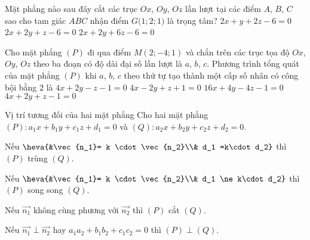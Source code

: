 \begin{ex}%
	Mặt phẳng nào sau đây cắt các trục $Ox$, $Oy$, $Oz$ lần lượt tại các điểm $A$, $B$, $C$ sao cho tam giác $ABC$ nhận điểm $G\big(1; 2; 1\big)$ là trọng tâm?
	{\True $2x + y + 2z  - 6 = 0$}
	{$2x + 2y + z  - 6 = 0$}
	{$2x + 2y + 6z - 6 = 0$} 
\end{ex}
\begin{ex}%
	Cho mặt phẳng  $\left(P\right)$ đi qua điểm $M\left(2; - 4; 1\right)$  và chắn trên các trục tọa độ $Ox$, $Oy$, $Oz$ theo ba đoạn có độ dài đại số lần lượt là $a$, $b$, $c$. Phương trình tổng quát của mặt phẳng $\left(P\right)$ khi $a$, $b$, $c$ theo thứ tự tạo thành một cấp số nhân có công bội bằng $2$ là 
	\choice
	{$4x + 2y - z - 1 = 0$}
	{$4x -  2y + z +  1 = 0$}
	{$16x + 4y - 4z - 1 = 0$}
	{\True $4x + 2y +  z - 1 = 0$}
\end{ex}

\begin{dang}{Vị trí tương đối của hai mặt phẳng}
	Cho hai mặt phẳng $(P) \colon a_1x+b_1y+c_1z+d_1=0$ và $(Q) \colon a_2x+b_2y+c_2z+d_2=0$.
		\begin{listEX}[1]
		\item [\ding{172}] Nếu $\heva{&\vec{n_1}= k \cdot \vec{n_2}\\& d_1 =k\cdot d_2}$ thì $(P)$ trùng $(Q)$.
		\item [\ding{173}] Nếu $\heva{&\vec{n_1}= k \cdot \vec{n_2}\\& d_1 \ne k\cdot d_2}$ thì $(P)$ song song $(Q)$.
		\item [\ding{174}] Nếu $\vec{n_1}$ không cùng phương với $\vec{n_2}$ thì $(P)$ cắt $(Q)$.
		\item [\ding{175}] Nếu $\vec{n_1} \perp \vec{n_2}$ hay $a_1a_2+b_1b_2+c_1c_2=0$ thì $(P) \perp (Q)$.
	\end{listEX}
\end{dang}
\setcounter{ex}{0}
\setcounter{vd}{0}
\viduminhhoa

